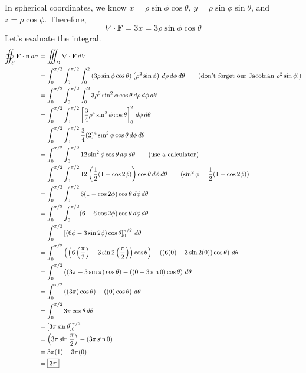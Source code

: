 \documentclass{article}
\newcommand{\lrp}[1]{\left( #1 \right)}
\newcommand{\lrb}[1]{\left[ #1 \right]}
\newcommand{\F}[0]{\mathbf{F}}
\newcommand{\n}[0]{{\mathbf{n}}}
\begin{document}
In spherical coordinates, we know $x=\rho\sin\phi\cos\theta$, $y=\rho\sin\phi\sin\theta$, and $z=\rho\cos\phi$. Therefore,
\begin{equation*}
    \nabla \cdot \F= 3x=3\rho\sin\phi\cos\theta
\end{equation*}
Let's evaluate the integral.
\begin{align*}
  \oiint_S \F\cdot \n\,d\sigma&=\iiint_D\nabla\cdot\F\,dV\\  &=\int_0^{\pi/2}\int_0^{\pi/2} \int_0^{2} \lrp{3\rho\sin\phi\cos\theta}\lrp{\rho^2\sin\phi}\,d\rho\,d\phi\,d\theta\tag{don't forget our Jacobian $\rho^2\sin\phi$!}\\
    &=\int_0^{\pi/2}\int_0^{\pi/2}\int_0^2 3\rho^3 \sin^2\phi\cos\theta\,d\rho\,d\phi\,d\theta\\
    &=\int_0^{\pi/2}\int_0^{\pi/2}\lrb{\frac{3}{4}\rho^4\sin^2\phi\cos\theta}_0^2\,d\phi\,d\theta\\
    &=\int_0^{\pi/2}\int_0^{\pi/2} \frac{3}{4}(2)^4\sin^2\phi\cos\theta\,d\phi\,d\theta\\
    &=\int_0^{\pi/2}\int_0^{\pi/2} 12\sin^2\phi\cos\theta\,d\phi\,d\theta\tag{use a calculator}\\
    &=\int_0^{\pi/2}\int_0^{\pi/2}12\lrp{\frac{1}{2}(1- \cos 2\phi)}\cos\theta\,d\phi\,d\theta\tag{$\sin^2\phi =\dfrac{1}{2}(1-\cos2\phi)$}\\
    &=\int_0^{\pi/2}\int_0^{\pi/2}6(1-\cos 2\phi)\cos\theta\,d\phi\,d\theta\\
    &=\int_0^{\pi/2}\int_0^{\pi/2} (6 - 6\cos 2\phi)\cos\theta\,d\phi\,d\theta\\
    &=\int_0^{\pi/2}\lrb{\lrp{6\phi - 3\sin 2\phi}\cos\theta}_0^{\pi/2}\,d\theta\\
    &=\int_0^{\pi/2} \lrp{\lrp{6\lrp{\frac{\pi}{2}}-3\sin 2\lrp{\frac{\pi}{2}}}\cos\theta}-\lrp{\lrp{6(0)-3\sin 2(0)}\cos \theta}\,d\theta\\
    &=\int_0^{\pi/2}\lrp{(3\pi - 3\sin \pi)\cos\theta}-\lrp{(0-3\sin 0)\cos\theta}\,d\theta\\
    &=\int_0^{\pi/2} \lrp{(3\pi)\cos\theta}- \lrp{(0)\cos\theta}\,d\theta\\
    &=\int_0^{\pi/2}3\pi\cos\theta \,d\theta\\
    &=\lrb{3\pi\sin\theta}_0^{\pi/2}\\
    &=\lrp{3\pi\sin\frac{\pi}{2}}-\lrp{3\pi\sin0}\\
    &=3\pi(1)-3\pi(0)\\
    &=\boxed{3\pi}
\end{align*}
\end{document}
